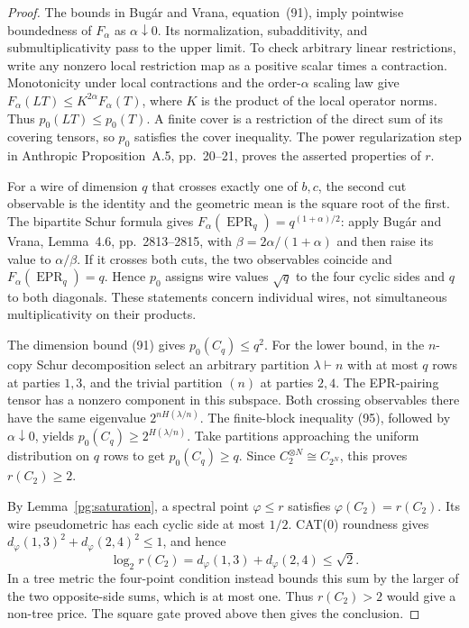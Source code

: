 \begin{proof}
The bounds in Bug\'ar and Vrana, equation~(91), imply pointwise
boundedness of $F_\alpha$ as $\alpha\downarrow0$. Its normalization,
subadditivity, and submultiplicativity pass to the upper limit.
To check arbitrary linear restrictions, write any nonzero local
restriction map as a positive scalar times a contraction. Monotonicity
under local contractions and the order-$\alpha$ scaling law give
$F_\alpha(LT)\leq K^{2\alpha}F_\alpha(T)$, where $K$ is the
product of the local operator norms. Thus $p_0(LT)\leq p_0(T)$.
A finite cover is a restriction of the direct sum of its covering
tensors, so $p_0$ satisfies the cover inequality. The power
regularization step in Anthropic Proposition~A.5, pp.~20--21,
proves the asserted properties of $r$.

For a wire of dimension $q$ that crosses exactly one of $b,c$,
the second cut observable is the identity and the geometric mean
is the square root of the first. The bipartite Schur formula gives
$F_\alpha(\operatorname{EPR}_q)=q^{(1+\alpha)/2}$: apply
Bug\'ar and Vrana, Lemma~4.6, pp.~2813--2815, with
$\beta=2\alpha/(1+\alpha)$ and then raise its value to
$\alpha/\beta$.
If it crosses both cuts, the two observables coincide and
$F_\alpha(\operatorname{EPR}_q)=q$. Hence $p_0$ assigns wire
values $\sqrt q$ to the four cyclic sides and $q$ to both diagonals.
These statements concern individual wires, not simultaneous
multiplicativity on their products.

The dimension bound (91) gives $p_0(C_q)\leq q^2$. For the lower
bound, in the $n$-copy Schur decomposition select an arbitrary
partition $\lambda\vdash n$ with at most $q$ rows at parties
$1,3$, and the trivial partition $(n)$ at parties $2,4$.
The EPR-pairing tensor has a nonzero component in this subspace.
Both crossing observables there have the same eigenvalue
$2^{nH(\lambda/n)}$. The finite-block inequality (95), followed by
$\alpha\downarrow0$, yields $p_0(C_q)\geq2^{H(\lambda/n)}$.
Take partitions approaching the uniform distribution on $q$ rows
to get $p_0(C_q)\geq q$. Since $C_2^{\otimes N}\cong C_{2^N}$,
this proves $r(C_2)\geq2$.

By Lemma~\ref{pg:saturation}, a spectral point $\varphi\leq r$
satisfies $\varphi(C_2)=r(C_2)$. Its wire pseudometric has each
cyclic side at most $1/2$. CAT(0) roundness gives
$d_\varphi(1,3)^2+d_\varphi(2,4)^2\leq1$, and hence
\[
 \log_2 r(C_2)=d_\varphi(1,3)+d_\varphi(2,4)\leq\sqrt2.
\]
In a tree metric the four-point condition instead bounds this sum
by the larger of the two opposite-side sums, which is at most one.
Thus $r(C_2)>2$ would give a non-tree price. The square gate proved
above then gives the conclusion.
\end{proof}

